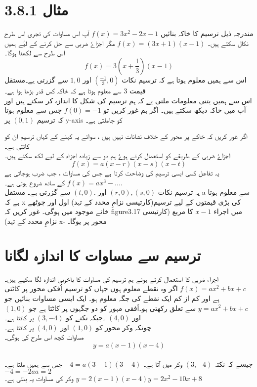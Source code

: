 \section{مثال 3.8.1}
مندرجہ ذیل ترسیم کا خاکہ بنائیں
$f(x)=3x^2-2x-1$
آپ اس مساوات کی تجری اس طرح نکال سکتے ہیں۔
$f(x)=(3x+1)(x-1)$
مگر اجزاےٗ ضربی سے حل کرنے کے لیٗے ہمیں اس طرح سے لکھنا ہوگا۔
$$f(x)=3(x+\frac{1}{3})(x-1)$$
اس سے ہمیں معلوم ہوتا ہے کہ ترسیم نکات
$(\frac{-1}{3},0)$  
اور
  $1,0$
  سے گزرتی ہے۔مستقل قیمت
3
سے معلوم ہوتا ہے کہ خاکہ کس قدر بڑھا ہوا ہے۔
\\
اس سے ہمیں یتنی معلومات ملتی یے کہ ہم ترسیم کی شکل کا اندازہ کر سکتے ہیں اور آپ 
میں خاکہ دیکھ سکتے ہیں۔
اگر ہم غور کریں تو 
$f(0)=-1$
جس سے معلوم ہوتا کہ ترسیم 
$(0,1)$
پر
y-axis
کو جاملتی ہے۔

اگر غور کریں کہ خاکے پر محور کے خلاف نشانات نہیں ہیں ، سوائے یہ کہنے کے کہاں
ترسیم ان کو کاٹتی ہے۔
\\
اجزاےٗ ضربی کے طریقے کو استعمال کرتے ہوےٗ ہم دو سے زیادہ اجزاء کے لیے لکھ سکتے ہیں۔
$$f(x)=a(x-r)(x-s)(x-t)$$
یہ تفاعل کسی ایسی ترسیم کی وضاحت کرتا ہے جس کی مساوات ، جب ضرب ہوجاتی ہے  
$f(x)=ax^3-... .$
کے ساتھ شروع ہوتی ہے۔
\\
یہ ترسیم نکات 
$(r,0),(s,0)$
اور
$(t,0).$
سے گزرتی ہے۔ مستقل      a    سے معلوم ہوتا ہے کہ     x   کی بڑی قیمتوں کے لیے ترسیم(کارتیسی نزامِ محدد کے تہد) اول اور چوٹھے خانے موجود میں ہوگی۔
غور کریں کہ 
figure3.17
میں اجراء
$x-1$
کا مربع (کارتیسی نزامِ محدد کے تہد)   x- محور پر یوگا۔ 
\section{ترسیم سے مساوات کا اندازہ لگانا}
اجراء ضربی کا استعمال کرتے ہوئے ہم ترسیم کی مساوات کا باخوبی اندازہ لگا سکیے ہیں۔
$ f(x)=ax^2+bx+c $
اگر وہ نقطے معلوم ہوں جہاں کو ترسیم اُفکی محور پر کاٹتی ہے اور کم از کم ایک نقطے کی جگہ معلوم ہو۔ 
\newpage
 ایک ایسی مساوات بنائیں جو 
\(y=ax^{2}+bx+c\)
سے تعلق رکھتی ہو۔اَفقی مہور کو دو جگہوں پر کاٹتا ہے جو 
$   (1,0) $
اور
$   (4,0)  $ 
۔جبکہ نکتے کو 
$ (3,-4)$
پر کاتتا ہے۔
\\
چونکہ وکر محور کو
\((1,0)\)  
اور
 \( (4,0)\)
پر  کاٹتا ہے۔ 
 \\
 مساوات کچھ اس طرح کی ہوگی۔
\[y=a(x-1)(x-4)\]\\
جیسے کہ نکتہ 
\((3,-4)\)
وکر میں آتا ہے۔
\( -4=a(3-1)(3-4)\)
جس سے ہمیں ملتا ہے۔
\(    -4=-2a     a=2 \)\\
وکر کی مساوات یہ بنتی ہے۔
\(y=2(x-1)(x-4)     y=2x^{2}-10x+8\)\\


